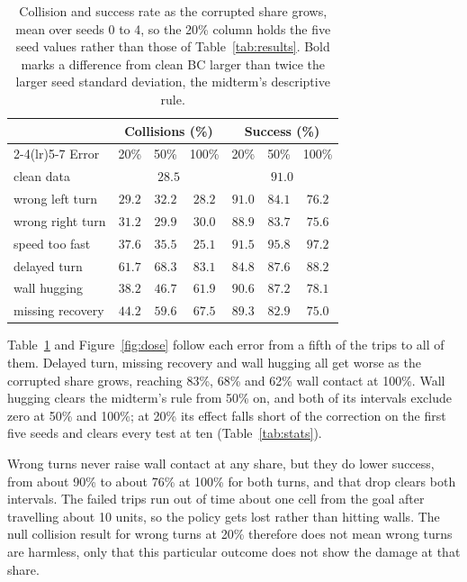 \documentclass[conference]{IEEEtran}
\begin{document}
\begin{table}[tbp]
\centering\small
\begin{tabular}{@{}lcccccc@{}}
\toprule
& \multicolumn{3}{c}{Collisions (\%)} & \multicolumn{3}{c}{Success (\%)}\\
\cmidrule(lr){2-4}\cmidrule(lr){5-7}
Error & 20\% & 50\% & 100\% & 20\% & 50\% & 100\%\\
\midrule
clean data & \multicolumn{3}{c}{$28.5$} & \multicolumn{3}{c}{$91.0$}\\
wrong left turn & $29.2$ & $32.2$ & $28.2$ & $91.0$ & $84.1$ & $\mathbf{76.2}$\\
wrong right turn & $31.2$ & $29.9$ & $30.0$ & $88.9$ & $83.7$ & $75.6$\\
speed too fast & $37.6$ & $35.5$ & $25.1$ & $91.5$ & $95.8$ & $97.2$\\
delayed turn & $61.7$ & $\mathbf{68.3}$ & $\mathbf{83.1}$ & $84.8$ & $87.6$ & $88.2$\\
wall hugging & $38.2$ & $\mathbf{46.7}$ & $\mathbf{61.9}$ & $90.6$ & $87.2$ & $\mathbf{78.1}$\\
missing recovery & $44.2$ & $\mathbf{59.6}$ & $\mathbf{67.5}$ & $89.3$ & $\mathbf{82.9}$ & $\mathbf{75.0}$\\
\bottomrule
\end{tabular}
\caption{Collision and success rate as the corrupted share grows, mean over seeds 0 to 4, so the 20\% column
holds the five seed values rather than those of Table~\ref{tab:results}. Bold marks a difference from clean BC
larger than twice the larger seed standard deviation, the midterm's descriptive rule.}
\label{tab:dose}
\end{table}

Table~\ref{tab:dose} and Figure~\ref{fig:dose} follow each error from a fifth of the trips to all of them.
Delayed turn, missing recovery and wall hugging all get worse as the corrupted share grows, reaching 83\%, 68\%
and 62\% wall contact at 100\%. Wall hugging clears the midterm's rule from 50\% on, and both of its intervals
exclude zero at 50\% and 100\%; at 20\% its effect falls short of the correction on the first five seeds and
clears every test at ten (Table~\ref{tab:stats}).

Wrong turns never raise wall contact at any share, but they do lower success, from about 90\% to about 76\% at
100\% for both turns, and that drop clears both intervals. The failed trips run
out of time about one cell from the goal after travelling about 10 units, so the policy gets lost rather than
hitting walls. The null collision result for wrong turns at 20\% therefore does not mean wrong turns are
harmless, only that this particular outcome does not show the damage at that share.
\end{document}
